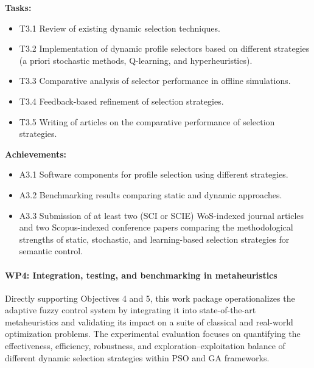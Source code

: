 \textbf{Tasks:}
\begin{itemize}
    \item T3.1 Review of existing dynamic selection techniques.
    \item T3.2 Implementation of dynamic profile selectors based on different strategies (a priori stochastic methods, Q-learning, and hyperheuristics).
    \item T3.3 Comparative analysis of selector performance in offline simulations.
    \item T3.4 Feedback-based refinement of selection strategies.
    \item T3.5 Writing of articles on the comparative performance of selection strategies.
\end{itemize}

\textbf{Achievements:}
\begin{itemize}
    \item A3.1 Software components for profile selection using different strategies.
    \item A3.2 Benchmarking results comparing static and dynamic approaches.
    \item A3.3 Submission of at least two (SCI or SCIE) WoS-indexed journal articles and two Scopus-indexed conference papers comparing the methodological strengths of static, stochastic, and learning-based selection strategies for semantic control.
\end{itemize}

\paragraph{WP4: Integration, testing, and benchmarking in metaheuristics}

Directly supporting Objectives 4 and 5, this work package operationalizes the adaptive fuzzy control system by integrating it into state-of-the-art metaheuristics and validating its impact on a suite of classical and real-world optimization problems. The experimental evaluation focuses on quantifying the effectiveness, efficiency, robustness, and exploration–exploitation balance of different dynamic selection strategies within PSO and GA frameworks.

